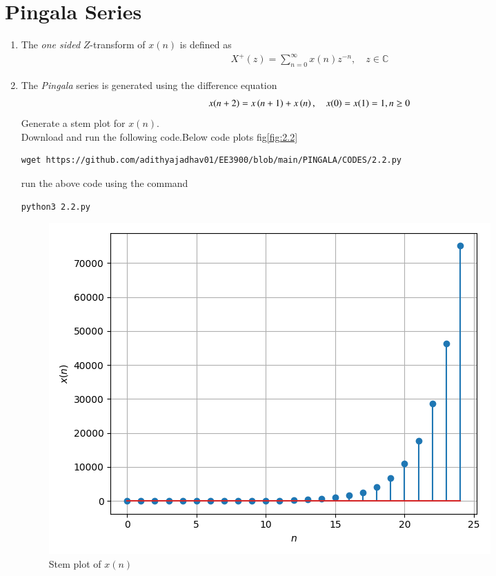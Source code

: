 \documentclass[journal,12pt,twocolumn]{IEEEtran}
\renewcommand\thesection{\arabic{section}}
\begin{document}
\section{Pingala Series}

\begin{enumerate}[label=\thesection.\arabic*,ref=\thesection.\theenumi]
\item The {\em one sided} $Z$-transform of $x(n)$ is defined as 
\begin{align}
	X^{+}(z) = \sum_{n = 0}^{\infty}x(n)z^{-n}, \quad z \in \mathbb{C}
\label{eq:one-Z}
\end{align}
	\item The {\em Pingala} series is generated using the difference equation 
\begin{align}
	x(n+2) = x\left(n+1\right) + x\left(n\right),  \quad x(0) = x(1) = 1, n \ge 0
	\label{eq:10-pingala}
\end{align}
Generate a stem plot for $x(n)$.\\
\solution Download and run the following code.Below code plots fig\eqref{fig:2.2}
\begin{lstlisting}
wget https://github.com/adithyajadhav01/EE3900/blob/main/PINGALA/CODES/2.2.py
\end{lstlisting}
run the above code using the command
\begin{lstlisting}
python3 2.2.py
\end{lstlisting}
\begin{figure}[h]
    \centering
    \includegraphics[width=\columnwidth]{./FIGURES/2.2.png}
    \caption{Stem plot of $x(n)$}
    \label{fig:2.2}

\end{figure}
\end{enumerate}
\end{document}
